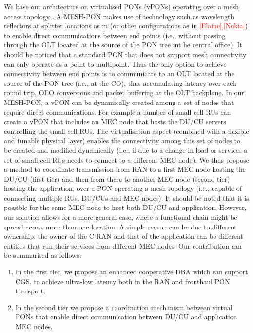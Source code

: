 \documentclass[a4paper, oneside, twocolumn, notitlepage, 10pt]{extarticle_ecoc}
\begin{document}
    We base our architecture on virtualised PONs (vPONs) operating over a mesh access topology \cite{MESH-Networks}. A MESH-PON makes use of technology such as wavelength reflectors at splitter locations as in \cite{MESH-JOCN} (or other configurations as in \textcolor{red}{[Elaine],[Nokia]}) to enable direct communications between end points (i.e., without passing through the OLT located at the source of the PON tree int he central office). It should be noticed that a standard PON that does not support mesh connectivity can only operate as a point to multipoint. Thus the only option to achieve connectivity between end points is to communicate to an OLT located at the source of the PON tree (i.e., at the CO), thus accumulating latency over each round trip, OEO conversions and packet buffering at the OLT backplane. In our MESH-PON, a vPON can be dynamically created among a set of nodes that require direct communications. For example a number of small cell RUs can create a vPON that includes an MEC node that hosts the DU/CU servers controlling the small cell RUs. The virtualisation aspect (combined with a flexible and tunable physical layer) enables the connectivity among this set of nodes to be created and modified dynamically (i.e., if due to a change in load or services a set of small cell RUs needs to connect to a different MEC node). We thus propose a method to coordinate transmission from RAN to a first MEC node hosting the DU/CU (first tier) and then from there to another MEC node (second tier) hosting the application, over a PON operating a mesh topology (i.e., capable of connecting multiple RUs, DU/CUs and MEC nodes). It should be noted that it is possible for the same MEC node to host both DU/CU and application. However, our solution allows for a more general case, where a functional chain might be spread across more than one location. A simple reason can be due to different ownership: the owner of the C-RAN and that of the application can be different entities that run their services from different MEC nodes.  %
    Our contribution can be summarised as follows:
    \begin{enumerate}
 		\item In the first tier, we propose an enhanced cooperative DBA which can support CGS, to achieve ultra-low latency both in the RAN and fronthaul PON transport.
 		\item In the second tier we propose a coordination mechanism between virtual PONs that enable direct communication between DU/CU and application MEC nodes. %
 	\end{enumerate}  
    
\end{document}
